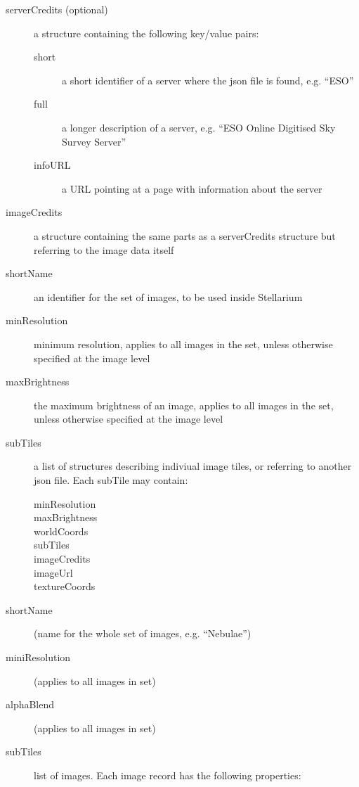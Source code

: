 \begin{description}
\item[serverCredits (optional)] a structure containing the following
  key/value pairs:

  \begin{description}
  \item[short] a short identifier of a server where the json file is found, e.g. ``ESO''
  \item[full]  a longer description of a server, e.g. ``ESO Online Digitised Sky Survey Server''
  \item[infoURL] a URL pointing at a page with information about the server
  \end{description}
\item[imageCredits] a structure containing the same parts as a
  serverCredits structure but referring to the image data itself
\item[shortName] an identifier for the set of images, to be used inside Stellarium
\item[minResolution] minimum resolution, applies to all images in the set,
  unless otherwise specified at the image level
\item[maxBrightness] the maximum brightness of an image, applies to all
  images in the set, unless otherwise specified at the image level
\item[subTiles] a list of structures describing indiviual image tiles, or
  referring to another json file. Each subTile may contain:

  \begin{description}
  \item[minResolution]
  \item[maxBrightness]
  \item[worldCoords]
  \item[subTiles]
  \item[imageCredits]
  \item[imageUrl]
  \item[textureCoords]
  \end{description}
\item[shortName] (name for the whole set of images, e.g. ``Nebulae'')
\item[miniResolution] (applies to all images in set)
\item[alphaBlend] (applies to all images in set)
\item[subTiles] list of images. Each image record has the following properties:


\end{description}
